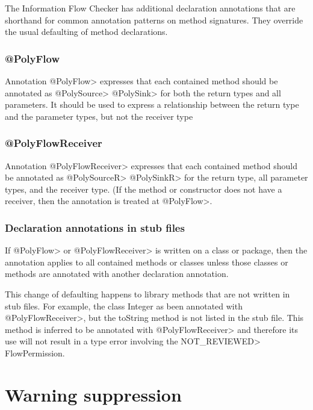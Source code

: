 The Information Flow Checker has additional declaration annotations that are shorthand for common 
annotation patterns on method signatures.   They override the usual defaulting of method declarations.

\subsubsection{@PolyFlow\label{sec:polyflow}}

Annotation \<@PolyFlow> expresses that each contained method should be annotated as \<@PolySource> 
\<@PolySink> for both the return types and all parameters. It should be used to express a relationship 
between the return type and the parameter types, but not the receiver type

\subsubsection{@PolyFlowReceiver\label{sec:polyflowreceiver}}

Annotation \<@PolyFlowReceiver> expresses that each contained method should be annotated as \<@PolySourceR> \<@PolySinkR> for the return type, all parameter types, and the receiver type.  
(If the method or constructor does not have a receiver, then the annotation is treated at \<@PolyFlow>.

\subsubsection{Declaration annotations in stub files\label{sec:declannosstubfiles}}
If \<@PolyFlow> or \<@PolyFlowReceiver> is written on a class or package, then the annotation applies
 to all contained methods or classes unless those classes or methods are annotated with another 
 declaration annotation.   

This change of defaulting happens to library methods that are not written in stub files.  For example, the class
 Integer as been annotated with  \<@PolyFlowReceiver>, but the toString method is not listed in the stub file.  
 This method is inferred to be annotated with  \<@PolyFlowReceiver> and therefore its use will not result in a 
 type error  involving the \<NOT\_REVIEWED> FlowPermission. 
 

\section{Warning suppression\label{sec:waringsuppression}}
 
